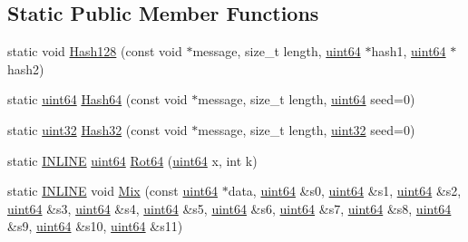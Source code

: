 \subsection*{Static Public Member Functions}
\begin{DoxyCompactItemize}
\item 
static void \hyperlink{classSpookyHash_a9d8973d46becbc8036c458fae3efc3a5}{Hash128} (const void $\ast$message, size\+\_\+t length, \hyperlink{SpookyV2_8h_abc0f5bc07737e498f287334775dff2b6}{uint64} $\ast$hash1, \hyperlink{SpookyV2_8h_abc0f5bc07737e498f287334775dff2b6}{uint64} $\ast$hash2)
\item 
static \hyperlink{SpookyV2_8h_abc0f5bc07737e498f287334775dff2b6}{uint64} \hyperlink{classSpookyHash_a4781c0814a39002c57900a108f3005f0}{Hash64} (const void $\ast$message, size\+\_\+t length, \hyperlink{SpookyV2_8h_abc0f5bc07737e498f287334775dff2b6}{uint64} seed=0)
\item 
static \hyperlink{SpookyV2_8h_acbd4acd0d29e2d6c43104827f77d9cd2}{uint32} \hyperlink{classSpookyHash_a73d8524c291fccbc319517341abb2f77}{Hash32} (const void $\ast$message, size\+\_\+t length, \hyperlink{SpookyV2_8h_acbd4acd0d29e2d6c43104827f77d9cd2}{uint32} seed=0)
\item 
static \hyperlink{SpookyV2_8h_a2eb6f9e0395b47b8d5e3eeae4fe0c116}{I\+N\+L\+I\+N\+E} \hyperlink{SpookyV2_8h_abc0f5bc07737e498f287334775dff2b6}{uint64} \hyperlink{classSpookyHash_a2b3b07af28a0b4f0f920fdb3a31a0c87}{Rot64} (\hyperlink{SpookyV2_8h_abc0f5bc07737e498f287334775dff2b6}{uint64} x, int k)
\item 
static \hyperlink{SpookyV2_8h_a2eb6f9e0395b47b8d5e3eeae4fe0c116}{I\+N\+L\+I\+N\+E} void \hyperlink{classSpookyHash_a749e6012af3d67884a323e227105e032}{Mix} (const \hyperlink{SpookyV2_8h_abc0f5bc07737e498f287334775dff2b6}{uint64} $\ast$data, \hyperlink{SpookyV2_8h_abc0f5bc07737e498f287334775dff2b6}{uint64} \&s0, \hyperlink{SpookyV2_8h_abc0f5bc07737e498f287334775dff2b6}{uint64} \&s1, \hyperlink{SpookyV2_8h_abc0f5bc07737e498f287334775dff2b6}{uint64} \&s2, \hyperlink{SpookyV2_8h_abc0f5bc07737e498f287334775dff2b6}{uint64} \&s3, \hyperlink{SpookyV2_8h_abc0f5bc07737e498f287334775dff2b6}{uint64} \&s4, \hyperlink{SpookyV2_8h_abc0f5bc07737e498f287334775dff2b6}{uint64} \&s5, \hyperlink{SpookyV2_8h_abc0f5bc07737e498f287334775dff2b6}{uint64} \&s6, \hyperlink{SpookyV2_8h_abc0f5bc07737e498f287334775dff2b6}{uint64} \&s7, \hyperlink{SpookyV2_8h_abc0f5bc07737e498f287334775dff2b6}{uint64} \&s8, \hyperlink{SpookyV2_8h_abc0f5bc07737e498f287334775dff2b6}{uint64} \&s9, \hyperlink{SpookyV2_8h_abc0f5bc07737e498f287334775dff2b6}{uint64} \&s10, \hyperlink{SpookyV2_8h_abc0f5bc07737e498f287334775dff2b6}{uint64} \&s11)

\end{DoxyCompactItemize}
